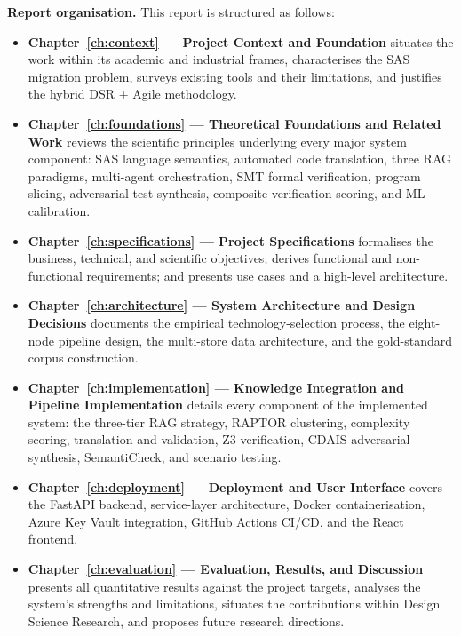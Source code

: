 \textbf{Report organisation.} This report is structured as follows:

\begin{itemize}
  \item \textbf{Chapter~\ref{ch:context} --- Project Context and Foundation}
    situates the work within its academic and industrial frames, characterises
    the SAS migration problem, surveys existing tools and their limitations,
    and justifies the hybrid DSR + Agile methodology.

  \item \textbf{Chapter~\ref{ch:foundations} --- Theoretical Foundations and
    Related Work} reviews the scientific principles underlying every major
    system component: SAS language semantics, automated code translation,
    three RAG paradigms, multi-agent orchestration, SMT formal verification,
    program slicing, adversarial test synthesis, composite verification scoring,
    and ML calibration.

  \item \textbf{Chapter~\ref{ch:specifications} --- Project Specifications}
    formalises the business, technical, and scientific objectives; derives
    functional and non-functional requirements; and presents use cases and
    a high-level architecture.

  \item \textbf{Chapter~\ref{ch:architecture} --- System Architecture and
    Design Decisions} documents the empirical technology-selection process,
    the eight-node pipeline design, the multi-store data architecture, and
    the gold-standard corpus construction.

  \item \textbf{Chapter~\ref{ch:implementation} --- Knowledge Integration and
    Pipeline Implementation} details every component of the implemented system:
    the three-tier RAG strategy, RAPTOR clustering, complexity scoring,
    translation and validation, Z3 verification, CDAIS adversarial synthesis,
    SemantiCheck, and scenario testing.

  \item \textbf{Chapter~\ref{ch:deployment} --- Deployment and User Interface}
    covers the FastAPI backend, service-layer architecture, Docker containerisation,
    Azure Key Vault integration, GitHub Actions CI/CD, and the React frontend.

  \item \textbf{Chapter~\ref{ch:evaluation} --- Evaluation, Results, and
    Discussion} presents all quantitative results against the project targets,
    analyses the system's strengths and limitations, situates the contributions
    within Design Science Research, and proposes future research directions.
\end{itemize}
